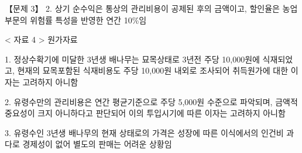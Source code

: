 \begin{longquestion}{【문제 3】}
2. 상기 순수익은 통상의 관리비용이 공제된 후의 금액이고, 할인율은 농업부문의 위험률 특성을 반영한 연간 10\%임 \par
< 자료 4 > 원가자료 \par
1. 정상수확기에 미달한 3년생 배나무는 묘목상태로 3년전 주당 10,000원에 식재되었고, 현재의 묘목포함된 식재비용도 주당 10,000원 내외로 조사되어 취득원가에 대한 이자는 고려하지 아니함 \par
2. 유령수만의 관리비용은 연간 평균기준으로 주당 5,000원 수준으로 파악되며, 금액적 중요성이 크지 아니하다고 판단되어 이의 투입시기에 따른 이자는 고려하지 아니함 \par
3. 유령수인 3년생 배나무의 현재 상태로의 가격은 성장에 따른 이식에서의 인건비 과다로 경제성이 없어 별도의 판매는 어려운 상황임 \par
\end{longquestion}
